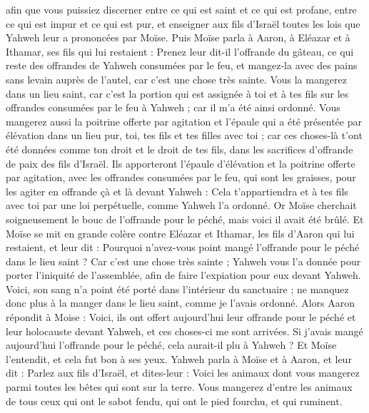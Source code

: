\begin{multicols}{2}
afin que vous puissiez discerner entre ce qui est saint et ce qui est profane, entre ce qui est impur et ce qui est pur,
et enseigner aux fils d'Israël toutes les lois que Yahweh leur a prononcées par Moïse.
Puis Moïse parla à Aaron, à Eléazar et à Ithamar, ses fils qui lui restaient : Prenez leur dit-il l'offrande du gâteau, ce qui reste des offrandes de Yahweh consumées par le feu, et mangez-la avec des pains sans levain auprès de l'autel, car c'est une chose très sainte.
Vous la mangerez dans un lieu saint, car c'est la portion qui est assignée à toi et à tes fils sur les offrandes consumées par le feu à Yahweh ; car il m'a été ainsi ordonné.
Vous mangerez aussi la poitrine offerte par agitation et l'épaule qui a été présentée par élévation dans un lieu pur, toi, tes fils et tes filles avec toi ; car ces choses-là t'ont été données comme ton droit et le droit de tes fils, dans les sacrifices d’offrande de paix des fils d'Israël.
Ils apporteront l'épaule d'élévation et la poitrine offerte par agitation, avec les offrandes consumées par le feu, qui sont les graisses, pour les agiter en offrande çà et là devant Yahweh : Cela t'appartiendra et à tes fils avec toi par une loi perpétuelle, comme Yahweh l'a ordonné.
Or Moïse cherchait soigneusement le bouc de l'offrande pour le péché, mais voici il avait été brûlé. Et Moïse se mit en grande colère contre Eléazar et Ithamar, les fils d'Aaron qui lui restaient, et leur dit :
Pourquoi n'avez-vous point mangé l'offrande pour le péché dans le lieu saint ? Car c'est une chose très sainte ; Yahweh vous l’a donnée pour porter l'iniquité de l'assemblée, afin de faire l’expiation pour eux devant Yahweh.
Voici, son sang n'a point été porté dans l’intérieur du sanctuaire ; ne manquez donc plus à la manger dans le lieu saint, comme je l'avais ordonné.
Alors Aaron répondit à Moise : Voici, ils ont offert aujourd'hui leur offrande pour le péché et leur holocauste devant Yahweh, et ces choses-ci me sont arrivées. Si j'avais mangé aujourd'hui l'offrande pour le péché, cela aurait-il plu à Yahweh ?
Et Moïse l'entendit, et cela fut bon à ses yeux.
\VerseOne{}Yahweh parla à Moïse et à Aaron, et leur dit :
Parlez aux fils d'Israël, et dites-leur : Voici les animaux dont vous mangerez parmi toutes les bêtes qui sont sur la terre.
Vous mangerez d'entre les animaux de tous ceux qui ont le sabot fendu, qui ont le pied fourchu, et qui ruminent.

\end{multicols}
